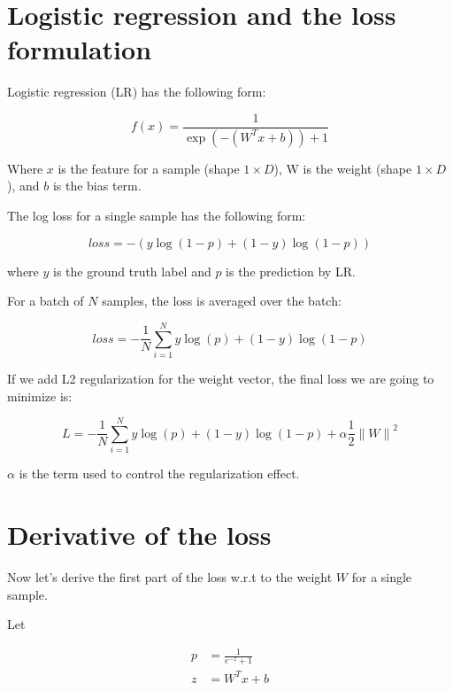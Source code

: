 \documentclass[a4paper, 12pt]{article}
\begin{document}
\section{Logistic regression and the loss formulation}

Logistic regression (LR) has the following form:

\begin{equation}\label{eq-logistic}
f(x) = \frac{1}{\exp(-(W^T x + b)) + 1}
\end{equation}

Where $x$ is the feature for a sample (shape $1\times D$), W is the weight (shape $1\times D$),
and $b$ is the bias term.

The log loss for a single sample has the following form:

\begin{equation}\label{eq-loss-single}
    loss = -(y\log(1-p) + (1-y)\log(1-p))
\end{equation}

where $y$ is the ground truth label and $p$ is the prediction by LR.

For a batch of $N$ samples, the loss is averaged over the batch:

\begin{equation}\label{eq-loss-batch-no-regu}
    loss = -\frac{1}{N}\sum_{i=1}^{N} y\log(p) + (1-y)\log(1-p)
\end{equation}

If we add L2 regularization for the weight vector, the final loss we are going to minimize is:

\begin{equation}\label{eq-loss-with-regu}
    L = -\frac{1}{N}\sum_{i=1}^{N} y\log(p) + (1-y)\log(1-p) + \alpha \frac{1}{2} {\lVert W \rVert}^2
\end{equation}

$\alpha$ is the term used to control the regularization effect.

\section{Derivative of the loss}

Now let's derive the first part of the loss w.r.t to the weight $W$ for a single sample.

Let

\begin{equation}
    \begin{aligned}
        p &= \frac{1}{e^{-z} + 1} \\
        z &= W^T x + b
    \end{aligned}
\end{equation}
\end{document}
